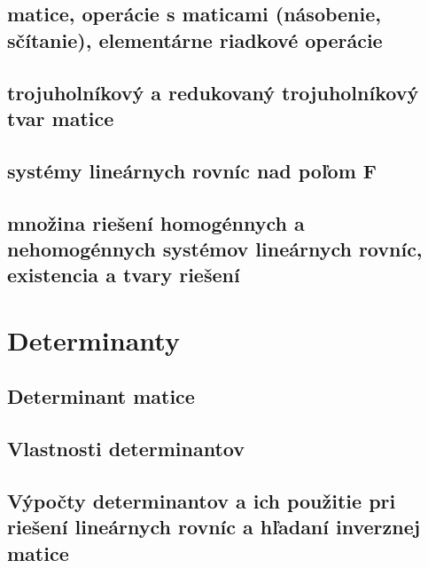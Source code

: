 \subsection{matice, operácie s maticami (násobenie, sčítanie), elementárne riadkové operácie}
\subsection{trojuholníkový a redukovaný trojuholníkový tvar matice}
\subsection{systémy lineárnych rovníc nad poľom F}
\subsection{množina riešení homogénnych a nehomogénnych systémov lineárnych rovníc, existencia a tvary riešení}

\section{Determinanty}
\subsection{Determinant matice}
\subsection{Vlastnosti determinantov}
\subsection{Výpočty determinantov a ich použitie pri riešení lineárnych rovníc a hľadaní inverznej matice}
